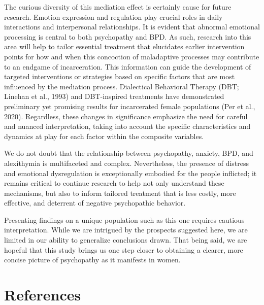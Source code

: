 \documentclass[
  man,floatsintext]{apa7}
\begin{document}
The curious diversity of this mediation effect is certainly cause for future research. Emotion expression and regulation play crucial roles in daily interactions and interpersonal relationships. It is evident that abnormal emotional processing is central to both psychopathy and BPD. As such, research into this area will help to tailor essential treatment that elucidates earlier intervention points for how and when this concoction of maladaptive processes may contribute to an endgame of incarceration. This information can guide the development of targeted interventions or strategies based on specific factors that are most influenced by the mediation process. Dialectical Behavioral Therapy (DBT; Linehan et al., 1993) and DBT-inspired treatments have demonstrated preliminary yet promising results for incarcerated female populations (Per et al., 2020). Regardless, these changes in significance emphasize the need for careful and nuanced interpretation, taking into account the specific characteristics and dynamics at play for each factor within the composite variables.

We do not doubt that the relationship between psychopathy, anxiety, BPD, and alexithymia is multifaceted and complex. Nevertheless, the presence of distress and emotional dysregulation is exceptionally embodied for the people inflicted; it remains critical to continue research to help not only understand these mechanisms, but also to inform tailored treatment that is less costly, more effective, and deterrent of negative psychopathic behavior.

Presenting findings on a unique population such as this one requires cautious interpretation. While we are intrigued by the prospects suggested here, we are limited in our ability to generalize conclusions drawn. That being said, we are hopeful that this study brings us one step closer to obtaining a clearer, more concise picture of psychopathy as it manifests in women.

\newpage

\hypertarget{references}{%
\section{References}\label{references}}
\end{document}
